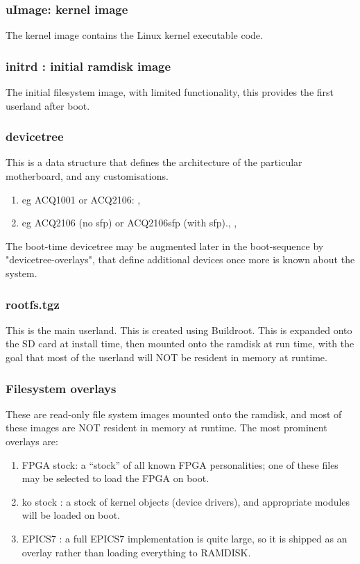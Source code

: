 \documentclass[]{article}
\begin{document}
\subsubsection{uImage: kernel image}
The kernel image contains the Linux kernel executable code.

\subsubsection{initrd : initial ramdisk image}
The initial filesystem image, with limited functionality, this provides the first userland after boot.

\subsubsection{devicetree}
This is a data structure that defines the architecture of the particular motherboard, and any customisations.
\begin{enumerate}
    \item eg ACQ1001 or ACQ2106: , 
    \item eg ACQ2106 (no sfp) or ACQ2106sfp (with sfp)., , 
\end{enumerate}
The boot-time devicetree may be augmented later in the boot-sequence by "devicetree-overlays", that define additional devices once more is known about the system.

\subsubsection{rootfs.tgz}
This is the main userland. This is created using Buildroot. This is expanded onto the SD card at install time, then mounted onto the ramdisk at run time, with the goal that most of the userland will NOT be resident in memory at runtime.

\subsubsection{Filesystem overlays}
These are read-only file system images mounted onto the ramdisk, and most of these images are NOT resident in memory at runtime. The most prominent overlays are:
\begin{enumerate}
    \item FPGA stock: a “stock” of all known FPGA personalities; one of these files may be selected to load the FPGA on boot.
    \item ko stock : a stock of kernel objects (device drivers), and appropriate modules will be loaded on boot.
    \item EPICS7 : a full EPICS7 implementation is quite large, so it is shipped as an overlay rather than loading everything to RAMDISK.
\end{enumerate}
\end{document}
